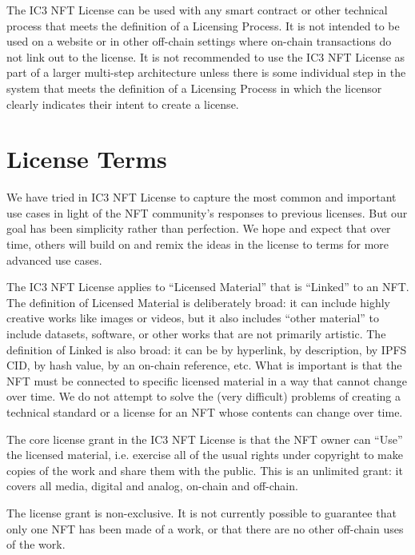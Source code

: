 \documentclass{article}
\newcommand{\iccclicense}{IC3 NFT License\xspace}
\begin{document}
The \iccclicense can be used with any smart contract or other technical process that meets the definition of a Licensing Process. It is not intended to be used on a website or in other off-chain settings where on-chain transactions do not link out to the license. It is not recommended to use the \iccclicense as part of a larger multi-step architecture unless there is some individual step in the system that meets the definition of a Licensing Process in which the licensor clearly indicates their intent to create a license.


\section{License Terms}

We have tried in \iccclicense to capture the most common and important use cases in light of the NFT community's responses to previous licenses. But our goal has been simplicity rather than perfection. We hope and expect that over time, others will build on and remix the ideas in the license to terms for more advanced use cases.

The \iccclicense applies to ``Licensed Material'' that is ``Linked'' to an NFT. The definition of Licensed Material is deliberately broad: it can include highly creative works like images or videos, but it also includes ``other material'' to include datasets, software, or other works that are not primarily artistic. The definition of Linked is also broad: it can be by hyperlink, by description, by IPFS CID, by hash value, by an on-chain reference, etc. What is important is that the NFT must be connected to specific licensed material in a way that cannot change over time. We do not attempt to solve the (very difficult) problems of creating a technical standard or a license for an NFT whose contents can change over time.

The core license grant in the \iccclicense is that the NFT owner can ``Use'' the licensed material, i.e. exercise all of the usual rights under copyright to make copies of the work and share them with the public. This is an unlimited grant: it covers all media, digital and analog, on-chain and off-chain. 

The license grant is non-exclusive. It is not currently possible to guarantee that only one NFT has been made of a work, or that there are no other off-chain uses of the work.
\end{document}
